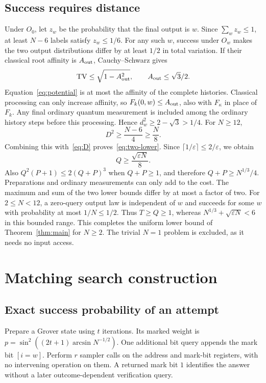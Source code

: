 \documentclass[11pt]{article}
\theoremstyle{remark}
\newcommand{\eps}{\varepsilon}
\begin{document}
\subsection{Success requires distance}
Under $O_0$, let $z_w$ be the probability that the final output is $w$.
Since $\sum_wz_w\le1$, at least $N-6$ labels satisfy $z_w\le1/6$.
For any such $w$, success under $O_w$ makes the two output distributions
differ by at least $1/2$ in total variation. If their classical root
affinity is $A_{\rm out}$, Cauchy--Schwarz gives
\[
 \operatorname{TV}\le\sqrt{1-A_{\rm out}^2},
 \qquad A_{\rm out}\le\sqrt{3}/2.
\]
Equation~\eqref{eq:potential} is at most the affinity of the complete
histories. Classical processing can only increase affinity, so
$F_k(0,w)\le A_{\rm out}$, also with $F_\kappa$ in place of $F_k$.
Any final ordinary quantum measurement is
included among the ordinary history steps before this processing. Hence
$d_w^2\ge2-\sqrt3>1/4$. For $N\ge12$,
\begin{equation}
 D^2\ge\frac{N-6}{4}\ge\frac N8.
\end{equation}
Combining this with~\eqref{eq:D} proves~\eqref{eq:two-lower}.
Since $\lceil1/\eps\rceil\le2/\eps$, we obtain
\[
 Q\ge\frac{\sqrt{\eps N}}8.
\]
Also $Q^2(P+1)\le2(Q+P)^3$ when $Q+P\ge1$, and therefore
$Q+P\ge N^{1/3}/4$. Preparations and ordinary measurements can only add to
the cost. The maximum and sum of the two lower bounds differ by at most a
factor of two. For $2\le N<12$, a zero-query output law is independent of
$w$ and succeeds for some $w$ with probability at most $1/N\le1/2$.
Thus $T\ge Q\ge1$, whereas $N^{1/3}+\sqrt{\eps N}<6$ in this bounded range.
This completes the uniform lower bound of Theorem~\ref{thm:main} for $N\ge2$.
The trivial $N=1$ problem is excluded, as it needs no input access.

\section{Matching search construction}\label{sec:upper}
\subsection{Exact success probability of an attempt}
Prepare a Grover state using $t$ iterations. Its marked weight is
$p=\sin^2((2t+1)\arcsin N^{-1/2})$. One additional bit query appends the
mark bit $[i=w]$. Perform $r$ sampler calls on the address and mark-bit
registers, with no intervening operation on them. A returned mark bit $1$
identifies the answer without a later outcome-dependent verification query.
\end{document}
